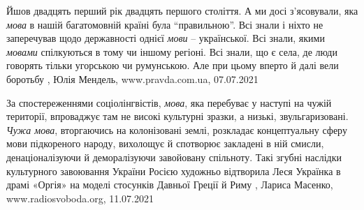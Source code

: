 Йшов двадцять перший рік двадцять першого століття. А ми досі з’ясовували, яка
\emph{мова} в нашій багатомовній країні була \enquote{правильною}. Всі знали і
ніхто не заперечував щодо державності однієї \emph{мови} – української.
Всі знали, якими \emph{мовами} спілкуються в тому чи іншому регіоні. Всі знали,
що є села, де люди говорять тільки угорською чи румунською. Але при цьому
вперто й далі вели боротьбу
, 
Юлія Мендель, www.pravda.com.ua, 07.07.2021

За спостереженнями соціолінгвістів, \emph{мова}, яка перебуває у наступі на чужій
території, впроваджує там не високі культурні зразки, а низькі,
звульгаризовані. \emph{Чужа мова}, вторгаючись на колонізовані землі, розкладає
концептуальну сферу мови підкореного народу, вихолощує й спотворює закладені в
ній смисли, денаціоналізуючи й деморалізуючи завойовану спільноту.
Такі згубні наслідки культурного завоювання України Росією художньо відтворила
Леся Українка в драмі «Оргія» на моделі стосунків Давньої Греції й Риму
, 
Лариса Масенко, www.radiosvoboda.org, 11.07.2021
